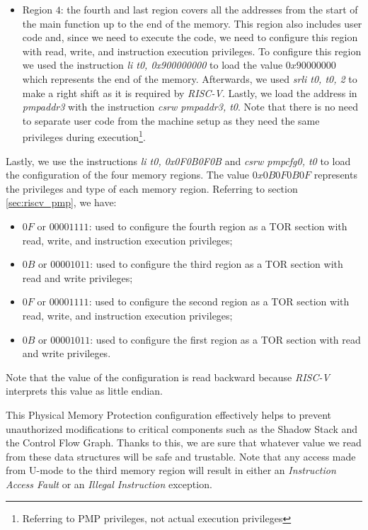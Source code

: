 \begin{itemize}
  \item Region $4$: the fourth and last region covers all the addresses from the
    start of the main function up to the end of the memory. This region also includes
    user code and, since we need to execute the code, we need to configure this region
    with read, write, and instruction execution privileges. To configure this
    region we used the instruction \textit{li t0, 0x900000000} to load the value
    $0x90000000$ which represents the end of the memory. Afterwards, we used \textit{srli
    t0, t0, 2} to make a right shift as it is required by \textit{RISC-V}.
    Lastly, we load the address in \textit{pmpaddr3} with the instruction
    \textit{csrw pmpaddr3, t0}. Note that there is no need to separate user code
    from the machine setup as they need the same privileges during execution\footnote{Referring
    to PMP privileges, not actual execution privileges}.
\end{itemize}

Lastly, we use the instructions \textit{li t0, 0x0F0B0F0B} and \textit{csrw
pmpcfg0, t0} to load the configuration of the four memory regions. The value
$0x0 B0F0B0F$ represents the privileges and type of each memory region. Referring
to section \ref{sec:riscv_pmp}, we have:
\begin{itemize}
  \item $0F$ or $00001111$: used to configure the fourth region as a TOR section
    with read, write, and instruction execution privileges;

  \item $0B$ or $00001011$: used to configure the third region as a TOR section
    with read and write privileges;

  \item $0F$ or $00001111$: used to configure the second region as a TOR section
    with read, write, and instruction execution privileges;

  \item $0B$ or $00001011$: used to configure the first region as a TOR section
    with read and write privileges.
\end{itemize}

Note that the value of the configuration is read backward because \textit{RISC-V}
interprets this value as little endian.

This Physical Memory Protection configuration effectively helps to prevent unauthorized
modifications to critical components such as the Shadow Stack and the Control Flow
Graph. Thanks to this, we are sure that whatever value we read from these data structures
will be safe and trustable. Note that any access made from U-mode to the third
memory region will result in either an \textit{Instruction Access Fault} or an \textit{Illegal
Instruction} exception.

